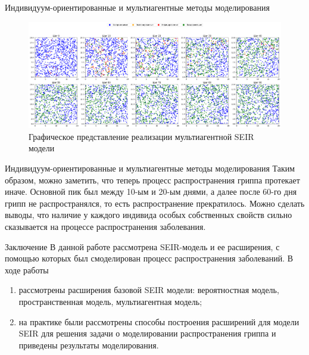 \documentclass[notheorems]{beamer}
\begin{document}

\begin{frame}
	{Индивидуум-ориентированные и мультиагентные методы моделирования}
\begin{figure}
	\centering
	\includegraphics[scale=0.2]{images/graph04}
	\caption{Графическое представление реализации мультиагентной SEIR модели}
	\label{fig:graph04}
\end{figure}
\end{frame}

\begin{frame}
	{Индивидуум-ориентированные и мультиагентные методы моделирования}
Таким образом, можно заметить, что теперь процесс распространения гриппа протекает иначе. Основной пик был между 10-ым и 20-ым днями, а далее после 60-го дня грипп не распространялся, то есть распространение прекратилось. Можно сделать выводы, что наличие у каждого индивида особых собственных свойств сильно сказывается на процессе распространения заболевания.
\end{frame}

\begin{frame}
	{Заключение}
	В данной работе рассмотрена SEIR-модель и ее расширения, с помощью которых был смоделирован процесс распространения заболеваний.
	В ходе работы
	\begin{enumerate}
		\item рассмотрены расширения базовой SEIR модели: вероятностная модель, пространственная модель, мультиагентная модель;
		\item на практике были рассмотрены способы построения расширений для модели SEIR для решения задачи о моделировании распространения гриппа и приведены результаты моделирования.
	\end{enumerate}
\end{frame}
\end{document}
